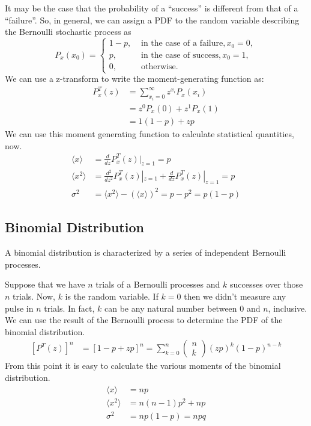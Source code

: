 \documentclass{article}
\begin{document}
It may be the case that the probability of a ``success'' is different from that
of a ``failure''. So, in general, we can assign a PDF to the random variable
describing the Bernoulli stochastic process as
\[
   P_{x}(x_{0}) = \begin{cases}
      1-p, &\text{ in the case of a failure} ,x_{0} = 0,\\
      p, & \text{ in the case of success} ,x_{0} = 1,\\
      0, & \text{ otherwise}.
   \end{cases}
\]
We can use a z-transform to write the moment-generating function as:
\begin{align*}
   P_{x}^{T}(z) &= \sum^{\infty}_{x_{i}=0} z^{x_{i}}P_{x}(x_{i}) \\
   &= z^{0} P_{x}(0) + z^{1}P_{x}(1) \\
   &= 1 \left( 1-p \right) + z p
\end{align*}
We can use this moment generating function to calculate statistical quantities,
now.
\begin{align*}
   \langle x \rangle &= \frac{d}{dz}P_{x}^{T}(z)|_{z=1} = p \\
   \langle x^2 \rangle &= \frac{d^2}{dz^2} P_{x}^{T}(z)|_{z=1} +
   \frac{d}{dz}P_{x}^{T}(z)|_{z=1} = p \\
   \sigma^{2} &= \langle x^2 \rangle - \left( \langle x \rangle \right)^2
   = p - p^2 = p \left( 1-p \right)
\end{align*}
\subsection{Binomial Distribution}
\label{sub:binomial_distribution}
A binomial distribution is characterized by a series of independent Bernoulli
processes.

Suppose that we have $ n $ trials of a Bernoulli processes and $ k $ successes
over those $ n $ trials. Now, $ k $ is the random variable. If $ k = 0 $ then we
didn't measure any pulse in $ n $ trials. In fact, $ k $ can be any natural
number between $ 0 $ and $ n $, inclusive. We can use the result of the
Bernoulli process to determine the PDF of the binomial distribution.
\begin{align*}
   \left[ P^{T}(z) \right]^n &= \left[ 1 - p + z p  \right]^n =
   \sum^{n}_{k=0} \begin{pmatrix}
      n \\ k
   \end{pmatrix}
   (z p)^k \left( 1-p \right)^{n-k}
\end{align*}
From this point it is easy to calculate the various moments of the binomial
distribution.
\begin{align*}
   \langle x \rangle &= n p \\
   \langle x^2 \rangle &= n\left( n - 1 \right)p^2 + n p \\
   \sigma^{2} &= n p \left( 1 - p \right) = n p q
\end{align*}
\end{document}
